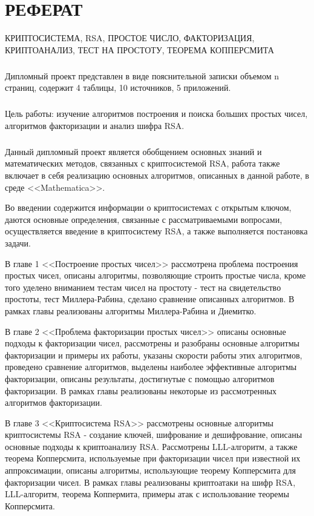 
\newpage
\chapter*{РЕФЕРАТ}

КРИПТОСИСТЕМА, RSA, ПРОСТОЕ ЧИСЛО, ФАКТОРИЗАЦИЯ, КРИПТОАНАЛИЗ, ТЕСТ НА ПРОСТОТУ, ТЕОРЕМА КОППЕРСМИТА

\paragraph{} Дипломный проект представлен в виде пояснительной записки объемом n страниц, содержит 4 таблицы, 10 источников, 5 приложений.

\paragraph{} Цель работы: изучение алгоритмов построения и поиска больших простых чисел, алгоритмов факторизации и анализ шифра RSA.

\paragraph{} Данный дипломный проект является обобщением основных знаний и математических методов, связанных с криптосистемой RSA, работа также
	включает в себя реализацию основных алгоритмов, описанных в данной работе, в среде <<Mathematica>>.	

	Во введении содержится информации о криптосистемах с открытым ключом, даются основные определения, связанные с рассматриваемыми вопросами,
	осуществляется введение в криптосистему RSA, а также выполняется постановка задачи.

	В главе 1 <<Построение простых чисел>> рассмотрена проблема построения простых чисел, описаны алгоритмы, позволяющие строить простые числа, 
	кроме того уделено вниманием тестам чисел на простоту - тест на свидетельство простоты, тест Миллера-Рабина, сделано сравнение описанных алгоритмов. В рамках 
	главы реализованы алгоритмы Миллера-Рабина и Диемитко.

	В главе 2 <<Проблема факторизации простых чисел>> описаны основные подходы к факторизации чисел, рассмотрены и разобраны основные алгоритмы факторизации и примеры их работы, указаны скорости работы этих алгоритмов, проведено сравнение алгоритмов, выделены наиболее эффективные алгоритмы факторизации, описаны результаты, достигнутые с помощью алгоритмов факторизации. В рамках главы реализованы некоторые из рассмотренных алгоритмов факторизации.

	В главе 3 <<Криптосистема RSA>> рассмотрены основные алгоритмы криптосистемы RSA - создание ключей, шифрование и дешифрование, описаны основные
	подходы к криптоанализу RSA. Рассмотрены LLL-алгоритм, а также теорема Копперсмита, используемые при факторизации чисел при известной их 
	аппроксимации, описаны алгоритмы, использующие теорему Копперсмита для факторизации чисел. В рамках главы реализованы криптоатаки на шифр RSA, LLL-алгоритм, теорема 
	Коппермита, примеры атак с использование теоремы Копперсмита.

\newpage

\newpage